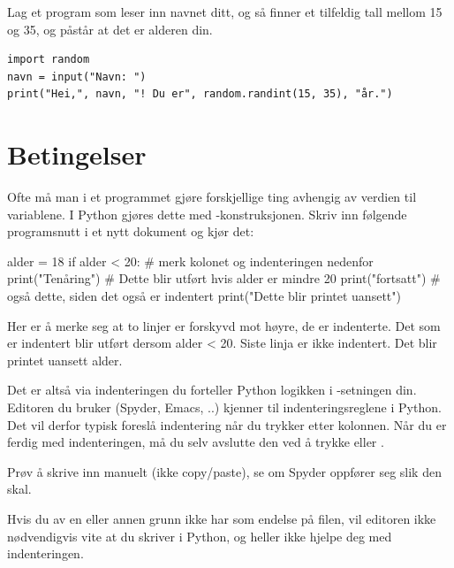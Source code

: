 \begin{exercise}
Lag et program som leser inn navnet ditt, og så finner et tilfeldig tall
mellom 15 og 35, og påstår at det er alderen din.
\end{exercise}
\begin{solution}
\begin{lstlisting}
import random
navn = input("Navn: ")
print("Hei,", navn, "! Du er", random.randint(15, 35), "år.")
\end{lstlisting}
\end{solution}

\section{Betingelser}

Ofte må man i et programmet gjøre forskjellige ting avhengig av verdien til variablene. I Python gjøres dette med -konstruksjonen. Skriv inn følgende programsnutt i et nytt dokument og kjør det: 

\begin{usncodebox}
alder = 18
if alder < 20:            # merk kolonet og indenteringen nedenfor
   print("Tenåring")      # Dette blir utført hvis alder er mindre 20
   print("fortsatt")      # også dette, siden det også er indentert
print("Dette blir printet uansett")
\end{usncodebox}

Her er å merke seg at to linjer er forskyvd mot høyre, de er indenterte. Det som er indentert blir utført dersom alder < 20. Siste linja er ikke indentert. Det blir printet uansett alder.

Det er altså via indenteringen du forteller Python logikken i -setningen din. Editoren du bruker (Spyder, Emacs, ..) kjenner til indenteringsreglene i Python. Det vil derfor typisk foreslå indentering når du trykker  etter kolonnen. Når du er ferdig med indenteringen, må du selv avslutte den ved å trykke  eller . 

Prøv å skrive inn manuelt (ikke copy/paste), se om Spyder oppfører seg slik den skal. 

\begin{usncomment}
Hvis du av en eller annen grunn ikke har  som endelse på filen, vil editoren ikke nødvendigvis vite at du skriver i Python, og heller ikke hjelpe deg med indenteringen.
\end{usncomment}

